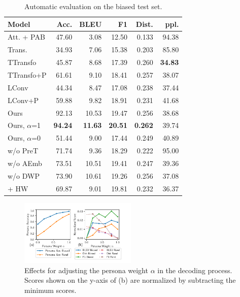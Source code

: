 \documentclass[letterpaper]{article} %
\begin{document}
\begin{table}[!t]
\centering
\caption{Automatic evaluation on the biased test set.}
\begin{tabular}{lrrrrr}
\toprule
Model             &  Acc.          &     BLEU       &    F1          &   Dist.        &    ppl.        \\
\midrule
Att. + PAB        &   47.60        &     3.08       &     12.50      &   0.133        &    94.38       \\
Trans.            &   34.93        &     7.06       &     15.38      &   0.203        &    85.80       \\
TTransfo          &   45.87        &     8.68       &     17.39      &   0.260        & \textbf{34.83} \\
TTransfo+P        &   61.61        &     9.10       &     18.41      &   0.257        &    38.07       \\
LConv             &   44.34        &     8.47       &     17.08      &   0.238        &    37.44       \\
LConv+P           &   59.88        &     9.82       &     18.91      &   0.231        &    41.68       \\
\midrule
Ours              &   92.13        &     10.53      &     19.47      &   0.256        &    38.68       \\
Ours, $\alpha$=1  & \textbf{94.24} & \textbf{11.63} & \textbf{20.51} & \textbf{0.262} &    39.74       \\
Ours, $\alpha$=0  &   51.44        &     9.00       &     17.44      &   0.249        &    40.89       \\
w/o PreT          &   71.74        &     9.36       &     18.29      &   0.222        &    95.00       \\
w/o AEmb          &   73.51        &     10.51      &     19.41      &   0.247        &    39.36       \\
w/o DWP           &   73.90        &     10.61      &     19.26      &   0.256        &    37.08       \\
\quad + HW        &   69.87        &     9.01       &     19.81      &   0.232        &    36.37       \\
\bottomrule
\end{tabular}
\label{tab:bias_result}
\end{table}

\begin{figure}[thbp!]
  \centering
  \includegraphics[width=210px]{figures/adjust_w.pdf}
  \caption{Effects for adjusting the persona weight $\alpha$ in the decoding process. Scores shown on the y-axis of (b) are normalized by subtracting the minimum scores.}
  \label{fig:adjust_w}
\end{figure}
\end{document}
